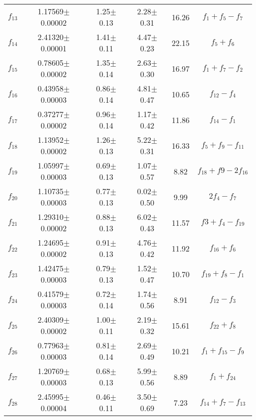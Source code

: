 \documentclass[useAMS,usenatbib,usegraphicx]{mn2e}
\begin{document}
\begin{table}
\begin{tabular}{lccccc}
$f_{13}$     & 1.17569$\pm$0.00002    & 1.25$\pm$0.13       & 2.28$\pm$0.31   & 16.26          & $f_1+f_5-f_7$              \\
$f_{14}$     & 2.41320$\pm$0.00001    & 1.41$\pm$0.11       & 4.47$\pm$0.23   & 22.15          & $f_5+f_6$                  \\
$f_{15}$     & 0.78605$\pm$0.00002    & 1.35$\pm$0.14       & 2.63$\pm$0.30   & 16.97          & $f_1+f_7-f_2$              \\
$f_{16}$     & 0.43958$\pm$0.00003    & 0.86$\pm$0.14       & 4.81$\pm$0.47   & 10.65          & $f_{12}-f_4$               \\
$f_{17}$     & 0.37277$\pm$0.00002    & 0.96$\pm$0.14       & 1.17$\pm$0.42   & 11.86          & $f_{14}-f_1$               \\
$f_{18}$     & 1.13952$\pm$0.00002    & 1.26$\pm$0.13       & 5.22$\pm$0.31   & 16.33          & $f_5+f_9-f_{11}$           \\
$f_{19}$     & 1.05997$\pm$0.00003    & 0.69$\pm$0.13       & 1.07$\pm$0.57   &  8.82          & $f_{18}+f{9}-2f_{16}$      \\
$f_{20}$     & 1.10735$\pm$0.00003    & 0.77$\pm$0.13       & 0.02$\pm$0.50   &  9.99          & $2f_4-f_7$                 \\
$f_{21}$     & 1.29310$\pm$0.00002    & 0.88$\pm$0.13       & 6.02$\pm$0.43   & 11.57          & $f3+f_4-f_{19}$            \\
$f_{22}$     & 1.24695$\pm$0.00002    & 0.91$\pm$0.13       & 4.76$\pm$0.42   & 11.92          & $f_{16}+f_6$               \\
$f_{23}$     & 1.42475$\pm$0.00003    & 0.79$\pm$0.13       & 1.52$\pm$0.47   & 10.70          & $f_{19}+f_8-f_1$           \\
$f_{24}$     & 0.41579$\pm$0.00003    & 0.72$\pm$0.14       & 1.74$\pm$0.56   &  8.91          & $f_{12}-f_3$               \\
$f_{25}$     & 2.40309$\pm$0.00002    & 1.00$\pm$0.11       & 2.19$\pm$0.32   & 15.61          & $f_{22}+f_8$               \\
$f_{26}$     & 0.77963$\pm$0.00003    & 0.81$\pm$0.14       & 2.69$\pm$0.49   & 10.21          & $f_1+f_{15}-f_9$           \\
$f_{27}$     & 1.20769$\pm$0.00003    & 0.68$\pm$0.13       & 5.99$\pm$0.56   &  8.89          & $f_1+f_{24}$               \\
$f_{28}$     & 2.45995$\pm$0.00004    & 0.46$\pm$0.11       & 3.50$\pm$0.69   &  7.23          & $f_{14}+f_7-f_{13}$        \\

\end{tabular}
\end{table}
\end{document}
